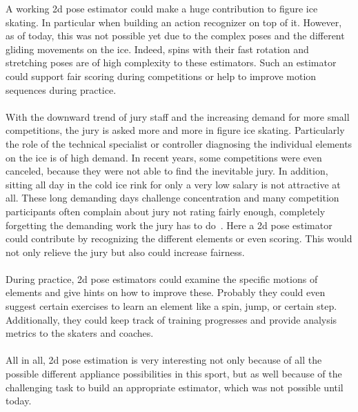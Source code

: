     A working 2d pose estimator could make a huge contribution to figure ice skating.
    In particular when building an action recognizer on top of it.
    However, as of today, this was not possible yet due to the complex poses and the different gliding movements
    on the ice.
    Indeed, spins with their fast rotation and stretching poses are of high complexity to these estimators.
    Such an estimator could support fair scoring during competitions or help to improve motion sequences during
    practice.
    \\\mbox{}\\
    With the downward trend of jury staff and the increasing demand for more small competitions, the jury is asked
    more and more in figure ice skating.
    Particularly the role of the technical specialist or controller diagnosing the individual elements on the ice
    is of high demand.
    In recent years, some competitions were even canceled, because they were not able to find the inevitable jury.
    In addition, sitting all day in the cold ice rink for only a very low salary is not attractive at all.
    These long demanding days challenge concentration and many competition participants often complain about jury
    not rating fairly enough,
    completely forgetting the demanding work the jury has to do~\cite{ungerjuryinterview, juryunger3minutes, unfairjudge}.
    Here a 2d pose estimator could contribute by recognizing the different elements or even scoring.
    This would not only relieve the jury but also could increase fairness.
    \\\mbox{}\\
    During practice, 2d pose estimators could examine the specific motions of elements and give hints on how to
    improve these.
    Probably they could even suggest certain exercises to learn an element like a spin, jump, or certain step.
    Additionally, they could keep track of training progresses and provide analysis metrics to the skaters and coaches.
    \\\mbox{}\\
    All in all, 2d pose estimation is very interesting not only because of all the possible different appliance
    possibilities in this sport,
    but as well because of the
    challenging task to build an appropriate estimator, which was not possible until today.



